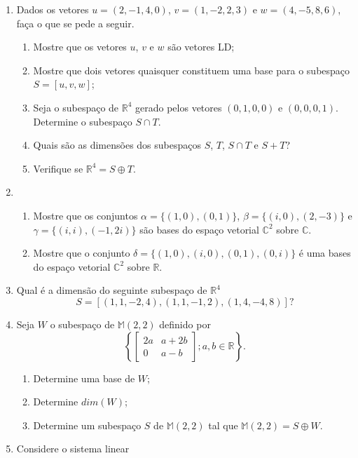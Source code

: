 \begin{enumerate}
\item 	Dados os vetores $u = (2,-1,4,0)$, $v = (1,-2,2,3)$  e $w=(4,-5,8,6)$, faça o que se pede  a seguir.
\begin{enumerate}[label=(\alph*)]
\item Mostre que os vetores $u$, $v$ e $w$ são vetores  LD;
\item Mostre que dois vetores quaisquer constituem uma base para o subespaço $S=[u, v, w]$;
\item Seja o subespaço de $\mathbb{R}^4$  gerado pelos vetores $(0,1,0,0)$ e $(0,0,0,1)$.  Determine o subespaço $ S \cap T$.
\item Quais são as dimensões dos subespaços $S$, $T$, $S \cap T$ e $S+T$?
\item Verifique se  $\mathbb{R}^4 =S \oplus T$.
\end{enumerate}


\item
\begin{enumerate}[label=(\alph*)]
\item Mostre que os conjuntos $\alpha= \{(1,0), (0,1) \}$, $\beta= \{(i,0), (2,-3) \}$ e $\gamma= \{(i,i), (-1,2i) \}$ são bases do espaço vetorial $\mathbb{C}^2$ sobre $\mathbb{C}$.
\item Mostre que o conjunto $\delta= \{(1,0), (i,0), (0,1), (0,i) \}$ é uma  bases do espaço vetorial $\mathbb{C}^2$ sobre $\mathbb{R}$.
\end{enumerate}



\item	Qual é a dimensão do seguinte   subespaço de $\mathbb{R}^4$
 $$S = [(1,1,-2,4), (1,1,-1,2),(1,4,-4,8)]?$$



\item Seja $W$ o subespaço de $\mathbb{M}(2,2)$ definido por $$\left\{ \begin{bmatrix}2a & a+2b \\ 0 & a-b \end{bmatrix}; a,b \in \mathbb{R} \right\}.$$
\begin{enumerate}[label=(\alph*)]
\item Determine uma base de $W$;
\item  Determine $dim(W)$;
\item Determine um subespaço $S$ de $\mathbb{M}(2,2)$ tal que $\mathbb{M}(2,2)= S \oplus W$.
\end{enumerate}


\item  Considere o sistema linear


\end{enumerate}

